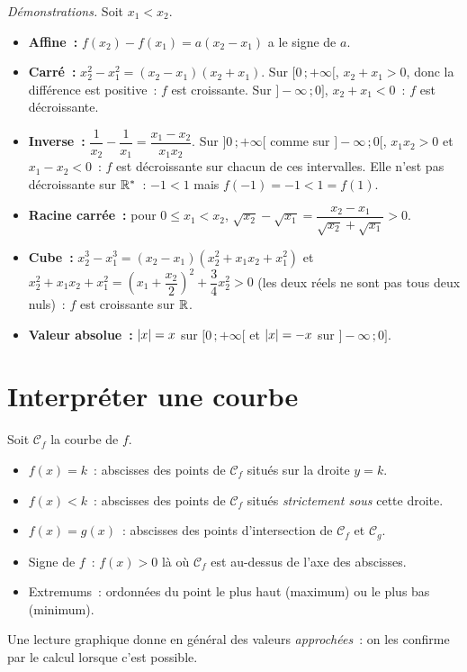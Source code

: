 \noindent\textit{D\'emonstrations.} Soit $x_1<x_2$.
\begin{itemize}
  \item \textbf{Affine~:} $f(x_2)-f(x_1)=a(x_2-x_1)$ a le signe de $a$.
  \item \textbf{Carr\'e~:} $x_2^2-x_1^2=(x_2-x_1)(x_2+x_1)$. Sur $[0\,;+\infty[$,
        $x_2+x_1>0$, donc la diff\'erence est positive~: $f$ est croissante.
        Sur $]-\infty\,;0]$, $x_2+x_1<0$~: $f$ est d\'ecroissante.
  \item \textbf{Inverse~:} $\dfrac1{x_2}-\dfrac1{x_1}=\dfrac{x_1-x_2}{x_1x_2}$.
        Sur $]0\,;+\infty[$ comme sur $]-\infty\,;0[$, $x_1x_2>0$ et $x_1-x_2<0$~:
        $f$ est d\'ecroissante sur chacun de ces intervalles. Elle n'est pas
        d\'ecroissante sur $\mathbb{R}^*$~: $-1<1$ mais $f(-1)=-1<1=f(1)$.
  \item \textbf{Racine carr\'ee~:} pour $0\leq x_1<x_2$,
        $\sqrt{x_2}-\sqrt{x_1}=\dfrac{x_2-x_1}{\sqrt{x_2}+\sqrt{x_1}}>0$.
  \item \textbf{Cube~:} $x_2^3-x_1^3=(x_2-x_1)(x_2^2+x_1x_2+x_1^2)$ et
        $x_2^2+x_1x_2+x_1^2=\left(x_1+\dfrac{x_2}{2}\right)^2+\dfrac34x_2^2>0$
        (les deux r\'eels ne sont pas tous deux nuls)~: $f$ est croissante sur $\mathbb{R}$.
  \item \textbf{Valeur absolue~:} $\left|x\right|=x$ sur $[0\,;+\infty[$ et $\left|x\right|=-x$
        sur $]-\infty\,;0]$.
\end{itemize}

\section{Interpr\'eter une courbe}

\begin{methode}
Soit $\mathcal C_f$ la courbe de $f$.
\begin{itemize}
  \item $f(x)=k$~: abscisses des points de $\mathcal C_f$ situ\'es sur la droite $y=k$.
  \item $f(x)<k$~: abscisses des points de $\mathcal C_f$ situ\'es \emph{strictement sous} cette droite.
  \item $f(x)=g(x)$~: abscisses des points d'intersection de $\mathcal C_f$ et $\mathcal C_g$.
  \item Signe de $f$~: $f(x)>0$ l\`a o\`u $\mathcal C_f$ est au-dessus de l'axe des abscisses.
  \item Extremums~: ordonn\'ees du point le plus haut (maximum) ou le plus bas (minimum).
\end{itemize}
Une lecture graphique donne en g\'en\'eral des valeurs \emph{approch\'ees}~:
on les confirme par le calcul lorsque c'est possible.
\end{methode}

